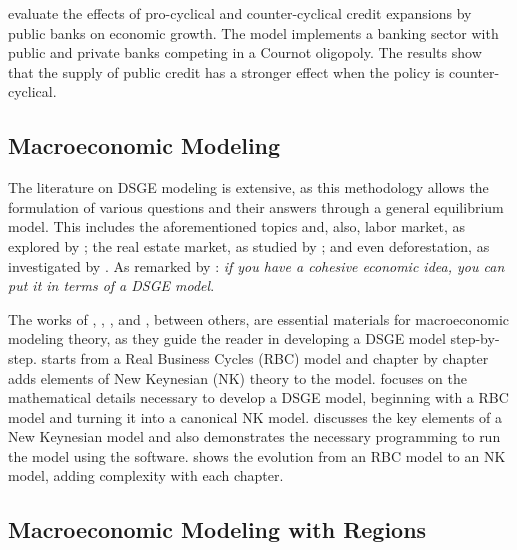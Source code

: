 \documentclass[../thesis.tex]{subfiles}
\begin{document}
\textcite{capeleti_countercyclical_2022} evaluate the effects of pro-cyclical and counter-cyclical credit expansions by public banks on economic growth. The model implements a banking sector with public and private banks competing in a Cournot oligopoly. The results show that the supply of public credit has a stronger effect when the policy is counter-cyclical.

\subsection*{Macroeconomic Modeling}

The literature on DSGE modeling is extensive, as this methodology allows the formulation of various questions and their answers through a general equilibrium model. This includes the aforementioned topics and, also, labor market, as explored by \textcite{ribeiro_alongamento_2023}; the real estate market, as studied by \textcite{albuquerquemello_mercado_2018}; and even deforestation, as investigated by \textcite{pereira_desmatamento_2013}. As remarked by \textcite{solis-garcia_ucb_2022}: \textit{if you have a cohesive economic idea, you can put it in terms of a DSGE model}. %

The works of \textcite{costa_junior_understanding_2016}, \textcite{solis-garcia_ucb_2022}, \textcite{bergholt_basic_2012}, and \textcite{gali_monetary_2015}, between others, are essential materials for macroeconomic modeling theory, as they guide the reader in developing a DSGE model step-by-step. \textcite{costa_junior_understanding_2016} starts from a Real Business Cycles (RBC) model and chapter by chapter adds elements of New Keynesian (NK) theory to the model. \textcite{solis-garcia_ucb_2022} focuses on the mathematical details necessary to develop a DSGE model, beginning with a RBC model and turning it into a canonical NK model. \textcite{bergholt_basic_2012} discusses the key elements of a New Keynesian model and also demonstrates the necessary programming to run the model using the \dynare{} software. \textcite{gali_monetary_2015} shows the evolution from an RBC model to an NK model, adding complexity with each chapter.


\subsection*{Macroeconomic Modeling with Regions}
\end{document}
